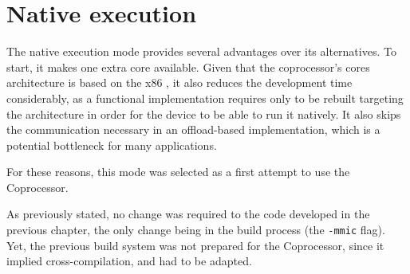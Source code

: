 \documentclass[../thesis]{subfiles}
\begin{document}
	\section{Native execution}
	\label{sec:mic:native}

	The native execution mode provides several advantages over its alternatives. To start, it makes one extra core available. Given that the coprocessor's cores architecture is based on the x86 \isa, it also reduces the development time considerably, as a \cpu functional implementation requires only to be rebuilt targeting the \mic architecture in order for the device to be able to run it natively. It also skips the communication necessary in an offload-based implementation, which is a potential bottleneck for many applications.

	For these reasons, this mode was selected as a first attempt to use the \intel\xeonphi Coprocessor.

	As previously stated, no change was required to the code developed in the previous chapter, the only change being in the build process (the \texttt{-mmic} flag). Yet, the previous build system was not prepared for the \intel\xeonphi Coprocessor, since it implied cross-compilation, and had to be adapted.

	
	
\end{document}
